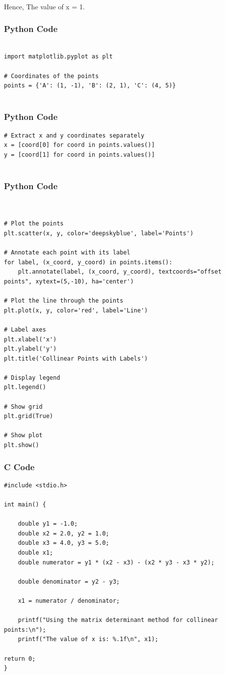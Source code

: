 \documentclass{beamer}
\begin{document}
Hence, The value of x = 1.


\begin{frame}[fragile]
    \frametitle{Python Code}
    \begin{lstlisting}
    
import matplotlib.pyplot as plt

# Coordinates of the points
points = {'A': (1, -1), 'B': (2, 1), 'C': (4, 5)}


     \end{lstlisting}
\end{frame}

\begin{frame}[fragile]
    \frametitle{Python Code}
    \begin{lstlisting}
# Extract x and y coordinates separately
x = [coord[0] for coord in points.values()]
y = [coord[1] for coord in points.values()]


     \end{lstlisting}
\end{frame}


\begin{frame}[fragile]
    \frametitle{Python Code}
    \begin{lstlisting}

    
# Plot the points
plt.scatter(x, y, color='deepskyblue', label='Points')

# Annotate each point with its label
for label, (x_coord, y_coord) in points.items():
    plt.annotate(label, (x_coord, y_coord), textcoords="offset points", xytext=(5,-10), ha='center')

# Plot the line through the points
plt.plot(x, y, color='red', label='Line')

# Label axes
plt.xlabel('x')
plt.ylabel('y')
plt.title('Collinear Points with Labels')

# Display legend
plt.legend()

# Show grid
plt.grid(True)

# Show plot
plt.show()

     \end{lstlisting}
\end{frame}

\begin{frame}[fragile]
\frametitle{C Code}
\begin{lstlisting}
#include <stdio.h>

int main() {

    double y1 = -1.0;
    double x2 = 2.0, y2 = 1.0;
    double x3 = 4.0, y3 = 5.0;
    double x1;
    double numerator = y1 * (x2 - x3) - (x2 * y3 - x3 * y2);

    double denominator = y2 - y3;

    x1 = numerator / denominator;

    printf("Using the matrix determinant method for collinear points:\n");
    printf("The value of x is: %.1f\n", x1);

return 0;
}

\end{lstlisting}

\end{frame}
\end{document}
